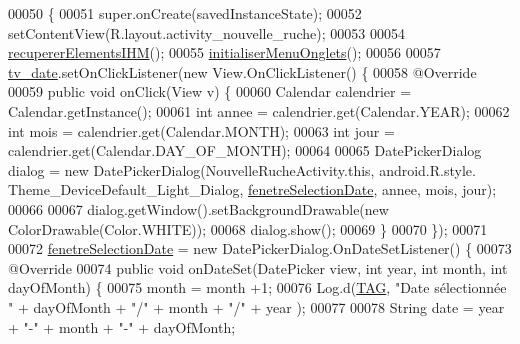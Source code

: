 \begin{DoxyCode}
00050                                                        \{
00051         super.onCreate(savedInstanceState);
00052         setContentView(R.layout.activity\_nouvelle\_ruche);
00053 
00054         \hyperlink{classfr_1_1campus_1_1laurainc_1_1honeybee_1_1_nouvelle_ruche_activity_adde8644c7ea0259edebc36f15de7a891}{recupererElementsIHM}();
00055         \hyperlink{classfr_1_1campus_1_1laurainc_1_1honeybee_1_1_nouvelle_ruche_activity_ad9bdfb01df8d7402b4da9858f263e1fd}{initialiserMenuOnglets}();
00056 
00057        \hyperlink{classfr_1_1campus_1_1laurainc_1_1honeybee_1_1_nouvelle_ruche_activity_aaca431bc75d86447e4ecbe01cfa9857d}{tv\_date}.setOnClickListener(\textcolor{keyword}{new} View.OnClickListener() \{
00058            @Override
00059            \textcolor{keyword}{public} \textcolor{keywordtype}{void} onClick(View v) \{
00060                Calendar calendrier = Calendar.getInstance();
00061                \textcolor{keywordtype}{int} annee = calendrier.get(Calendar.YEAR);
00062                \textcolor{keywordtype}{int} mois = calendrier.get(Calendar.MONTH);
00063                \textcolor{keywordtype}{int} jour = calendrier.get(Calendar.DAY\_OF\_MONTH);
00064 
00065                DatePickerDialog dialog = \textcolor{keyword}{new} DatePickerDialog(NouvelleRucheActivity.this, android.R.style.
      Theme\_DeviceDefault\_Light\_Dialog, \hyperlink{classfr_1_1campus_1_1laurainc_1_1honeybee_1_1_nouvelle_ruche_activity_a41f4797d95ad07979e5a1fc7fb061269}{fenetreSelectionDate}, annee, mois, jour);
00066 
00067                dialog.getWindow().setBackgroundDrawable(\textcolor{keyword}{new} ColorDrawable(Color.WHITE));
00068                dialog.show();
00069            \}
00070        \});
00071 
00072        \hyperlink{classfr_1_1campus_1_1laurainc_1_1honeybee_1_1_nouvelle_ruche_activity_a41f4797d95ad07979e5a1fc7fb061269}{fenetreSelectionDate} = \textcolor{keyword}{new} DatePickerDialog.OnDateSetListener() \{
00073            @Override
00074            \textcolor{keyword}{public} \textcolor{keywordtype}{void} onDateSet(DatePicker view, \textcolor{keywordtype}{int} year, \textcolor{keywordtype}{int} month, \textcolor{keywordtype}{int} dayOfMonth) \{
00075                month = month +1;
00076                Log.d(\hyperlink{classfr_1_1campus_1_1laurainc_1_1honeybee_1_1_nouvelle_ruche_activity_afa1372bcc0387e18df3877ebe605670d}{TAG}, \textcolor{stringliteral}{"Date sélectionnée "} + dayOfMonth + \textcolor{stringliteral}{"/"} + month + \textcolor{stringliteral}{"/"} + year );
00077 
00078                String date = year + \textcolor{stringliteral}{"-"} + month + \textcolor{stringliteral}{"-"} + dayOfMonth;

\end{DoxyCode}
